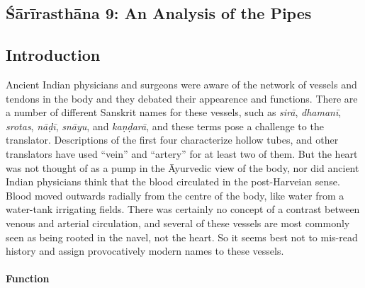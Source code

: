\begin{refsection} 
\chapter{Śārīrasthāna 9:  An Analysis of the Pipes}

\setcounter{footnote}{0}

\section{Introduction}

%
%
%
%
%
%

Ancient Indian physicians and surgeons were aware of the network of
vessels and tendons in the body and they debated their appearence and
functions. There are a number of different Sanskrit names for these
vessels, such as \emph{sirā}, \emph{dhamanī}, \emph{srotas},
\emph{nāḍī}, \emph{snāyu}, and \emph{kaṇḍarā}, and these terms pose a
challenge to the translator.  Descriptions of the first four
characterize hollow tubes, and other translators have used “vein” and
“artery” for at least two of them.  But the heart was not thought of
as a pump in the Āyurvedic view of the body, nor did ancient Indian
physicians think that the blood circulated in the post-Harveian sense.
Blood moved outwards radially from the centre of the body, like water
from a water-tank irrigating fields.  There was certainly no concept
of a contrast between venous and arterial circulation, and several of
these vessels are most commonly seen as being rooted in the navel, not
the heart.  So it seems best not to mis-read history and assign provocatively
modern names to these vessels.

\subsubsection{Function}


\end{refsection}
